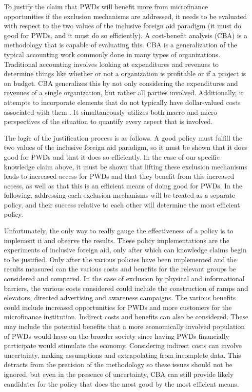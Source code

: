 \documentclass[a4paper]{article}
\begin{document}
To justify the claim that PWDs will benefit more from microfinance
opportunities if the exclusion mechanisms are addressed, it needs to be
evaluated with respect to the two values of the inclusive foreign aid paradigm
(it must do good for PWDs, and it must do so efficiently). A cost-benefit
analysis (CBA) is a methodology that is capable of evaluating this. CBA is a
generalization of the typical accounting work commonly done in many types of
organizations. Traditional accounting involves looking at expenditures and
revenues to determine things like whether or not a organization is profitable
or if a project is on budget. CBA generalizes this by not only considering the
expenditures and revenues of a single organization, but rather all parties
involved. Additionally, it attempts to incorporate elements that do not
typically have dollar-valued costs associated with them
\citep{mishan2015elements}. It simultaneously utilizes both macro and micro
perspectives of the situation to quantify every aspect that is involved.

The logic of the justification process is as follows. A good policy must
fulfill the two values of the inclusive foreign aid paradigm, so it must be
shown that it does good for PWDs and that it does so efficiently. In the case
of our specific knowledge claim above, it must be shown that lifting these
exclusion mechanisms leads to increased access for PWDs and that they benefit
from this increased access, as well as that this is an efficient means of
doing good for PWDs. In the following, addressing each exclusion mechanisms
will be treated as a separate policy, and their success relative to each other
will determine the most efficient policy.

Unfortunately, the only way to really gauge the effectiveness of a policy is
to implement it and observe the results. These policy implementations are the
experiments of inclusive foreign aid, only after which can knowledge claims
begin to be justified. Only after the various policies have been implemented
and the results measured can the various costs and benefits for the relevant
groups be considered and compared. In the case of exclusion by physical and
informational barriers, the various costs considered could include the
construction of ramps and elevators, directed advertising and awareness
campaigns. The various benefits could include increased opportunities for PWDs
and more customers for the microfinance institution. Indirect costs and
benefits can also be considered. These may include the potential benefits that
a more economically involved population of PWDs would have on the broader
society since having PWDs financially participate would stimulate the economy.
Considering indirect costs can involve uncertainty, making assumptions and
extrapolating from incomplete data. This detracts from the precision of the
methodology so these issues should not be ignored, but even in the presence of
uncertainty, CBA can still provide likely candidates for the policy that does
the most good by the most efficient means.
\end{document}
